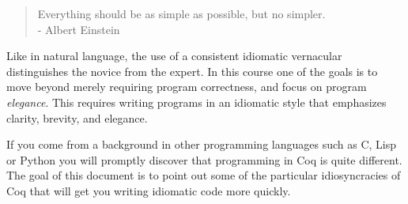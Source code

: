 \documentclass{coq311notes}
\begin{document}
\maketitle

\begin{quote}
  Everything should be as simple as possible, but no simpler.\\
  \-- Albert Einstein
\end{quote}

Like in natural language, the use of a consistent idiomatic vernacular
distinguishes the novice from the expert. In this course one of the
goals is to move beyond merely requiring program correctness, and
focus on program \emph{elegance}. This requires writing programs in an
idiomatic style that emphasizes clarity, brevity, and elegance.

If you come from a background in other programming languages such as
C, Lisp or Python you will promptly discover that programming in Coq
is quite different. The goal of this document is to point out some of
the particular idiosyncracies of Coq that will get you writing
idiomatic code more quickly.

\section{}
\end{document}
